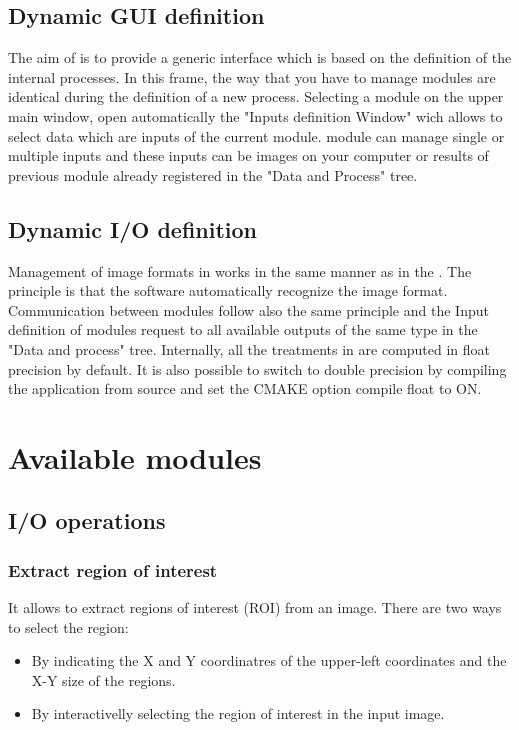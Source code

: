 
\subsection{Dynamic GUI definition}
The aim of \mont is to provide a generic interface which is based on
the definition of the internal processes.  In this frame, the way that you have to manage modules are identical during the definition of
a new process.  Selecting a module on the upper main window, open
automatically the "Inputs definition Window" wich allows to select
data which are inputs of the current module. \mont module can manage
single or multiple inputs and these inputs can be images on your
computer or results of previous module already registered in the "Data
and Process" tree.
    
\subsection{Dynamic I/O definition}
Management of image formats in \mont works in the same manner as in
the \otb.  The principle is that the software automatically recognize
the image format.  Communication between modules follow also the same
principle and the Input definition of modules request to all available
outputs of the same type in the "Data and process" tree.  Internally,
all the treatments in \mont are computed in float precision by
default. It is also possible to switch to double precision by
compiling the application from source and set the CMAKE option compile
float to ON.

\section{Available modules}\label{sec:modules} 
\subsection{I/O operations}
\subsubsection{Extract region of interest}
It allows to extract regions of interest (ROI) from an image. There
are two ways to select the region:
\begin{itemize}
\item By indicating the X and Y coordinatres of the upper-left
  coordinates and the X-Y size of the regions.
\item By interactivelly selecting the region of interest in the input image.
\end{itemize}


